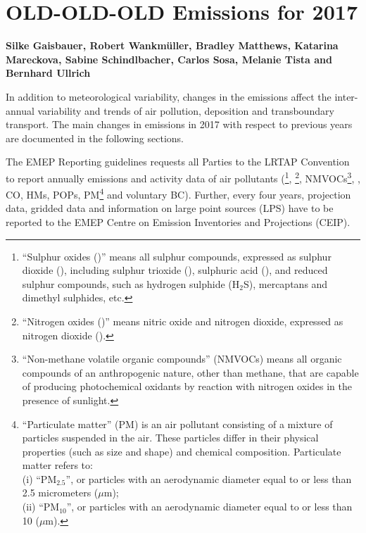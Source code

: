 \chapter[Emissions 2017]{OLD-OLD-OLD Emissions for 2017}
\label{ch:emis2017}

{\bf{Silke Gaisbauer, Robert Wankm\"uller, Bradley Matthews, Katarina Mareckova, Sabine Schindlbacher, Carlos Sosa, Melanie Tista and  Bernhard Ullrich}}
\vspace{30pt}

In addition to meteorological variability, changes in the emissions
affect the inter-annual variability and trends of air pollution,
deposition and transboundary transport.  
The main changes in emissions in 2017 with respect to previous years
are documented in the following sections.



The EMEP Reporting guidelines \citep{UNECE2014} requests all Parties
to the LRTAP Convention to report annually emissions and activity data of air pollutants
(\sox\footnote{``Sulphur oxides (\sox)'' means all sulphur compounds,
  expressed as sulphur dioxide (\soii), including sulphur trioxide
  (\soiii), sulphuric acid (\sulacid), and reduced sulphur compounds,
  such as hydrogen sulphide (H${_2}$S), mercaptans and dimethyl
  sulphides, etc.}, \noii\footnote{``Nitrogen oxides (\nox)'' means
  nitric oxide and nitrogen dioxide, expressed as nitrogen dioxide
  (\noii).}, NMVOCs\footnote{``Non-methane volatile organic
  compounds'' (NMVOCs) means all organic compounds of an anthropogenic
  nature, other than methane, that are capable of producing
  photochemical oxidants by reaction with nitrogen oxides in the
  presence of sunlight.}, \nhiii, CO, HMs, POPs,
PM\footnote{``Particulate matter'' (PM) is an air pollutant
  consisting of a mixture of particles suspended in the air. These
  particles differ in their physical properties (such as size and
  shape) and chemical composition. Particulate matter refers to:\\  
(i) ``PM$_{2.5}$'', or particles with an aerodynamic diameter equal to or
  less than 2.5 micrometers ($\mu$m);\\ 
(ii) ``PM$_{10}$'', or particles with an aerodynamic diameter equal to or
  less than 10 ($\mu$m).} and voluntary BC). Further, every four years,
projection data, gridded data and information on large point sources (LPS)
have to be reported to the EMEP Centre on Emission Inventories and Projections (CEIP).

